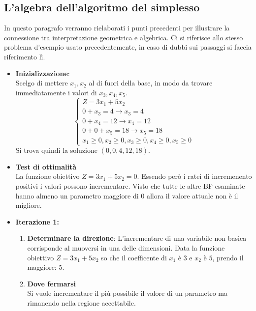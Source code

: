 \documentclass{article}
\newcommand*\circled[1]{\tikz[baseline=(char.base)]{
            \node[shape=circle,draw,inner sep=1pt] (char) {#1};}}
\begin{document}
\subsection{L'algebra dell'algoritmo del simplesso}
In questo paragrafo verranno rielaborati i punti precedenti per illustrare la connessione tra interpretazione geometrica e algebrica. Ci si riferisce allo stesso problema d'esempio usato precedentemente, in caso di dubbi sui passaggi si faccia riferimento lì.
\begin{tcolorbox}[breakable]
  \begin{itemize}
    \item \textbf{Inizializzazione}: \\
          Scelgo di mettere $x_1, x_2$ al di fuori della base, in modo da trovare immediatamente i valori di $x_3, x_4, x_5$.
          $$
            \begin{cases}
              Z = 3x_1 + 5x_2           \\
              0+x_3 =  4 \to x_3=4      \\
              0 +x_4 =  12 \to x_4 = 12 \\
              0+0+x_5 = 18 \to x_5 = 18 \\
              x_1 \ge 0,
              x_2 \ge 0,
              x_3 \ge 0,
              x_4 \ge 0,
              x_5 \ge 0
            \end{cases}
          $$
          Si trova quindi la soluzione $(0,0,4,12,18)$.
    \item \circled{1}\textbf{Test di ottimalità} \\
          La funzione obiettivo $Z=3x_1+5x_2=0$. Essendo però i ratei di incremenento positivi i valori possono incrementare. Visto che tutte le altre BF esaminate hanno almeno un parametro maggiore di $0$ allora il valore attuale non è il migliore.
    \item \textbf{Iterazione 1:}
          \begin{enumerate}
            \item \textbf{Determinare la direzione}:
                  L'incrementare di una variabile non basica corrisponde al muoversi in una delle dimensioni. Data la funzione obiettivo $Z=3x_1+5x_2$ so che il coefficente di $x_1$ è $3$ e $x_2$ è $5$, prendo il maggiore: $5$.
            \item \textbf{Dove fermarsi} \\
                  Si vuole incrementare il più possibile il valore di un parametro ma rimanendo nella regione accettabile.

\end{enumerate}
\end{itemize}
\end{tcolorbox}
\end{document}

